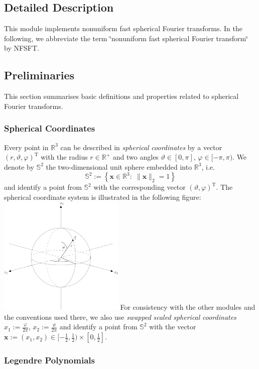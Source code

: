 \subsection{Detailed Description}
This module implements nonuniform fast spherical Fourier transforms. In the following, we abbreviate the term \char`\"{}nonuniform fast spherical Fourier transform\char`\"{} by NFSFT.\hypertarget{group__nfsft_Preliminaries}{}\subsection{Preliminaries}\label{group__nfsft_Preliminaries}
This section summarises basic definitions and properties related to spherical Fourier transforms.\hypertarget{group__nfsft_sc}{}\subsubsection{Spherical Coordinates}\label{group__nfsft_sc}
Every point in $\mathbb{R}^3$ can be described in {\em spherical\/} {\em coordinates\/} by a vector $(r,\vartheta,\varphi)^{\mathrm{T}}$ with the radius $r \in \mathbb{R}^{+}$ and two angles $\vartheta \in [0,\pi]$, $\varphi \in [-\pi,\pi)$. We denote by $\mathbb{S}^2$ the two-dimensional unit sphere embedded into $\mathbb{R}^3$, i.e. \[ \mathbb{S}^2 := \left\{\mathbf{x} \in \mathbb{R}^{3}:\; \|\mathbf{x}\|_2=1\right\} \] and identify a point from $\mathbb{S}^2$ with the corresponding vector $(\vartheta,\varphi)^{\mathrm{T}}$. The spherical coordinate system is illustrated in the following figure:  \mbox{\includegraphics[width=0.45\textwidth]{sphere}}
 For consistency with the other modules and the conventions used there, we also use {\em swapped\/} {\em scaled\/} {\em spherical\/} {\em coordinates\/} $x_1 := \frac{\varphi}{2\pi}$, $x_2 := \frac{\vartheta}{2\pi}$ and identify a point from $\mathbb{S}^2$ with the vector $\mathbf{x} := \left(x_1,x_2\right) \in [-\frac{1}{2}, \frac{1}{2}) \times [0,\frac{1}{2}]$.\hypertarget{group__nfsft_lp}{}\subsubsection{Legendre Polynomials}\label{group__nfsft_lp}
